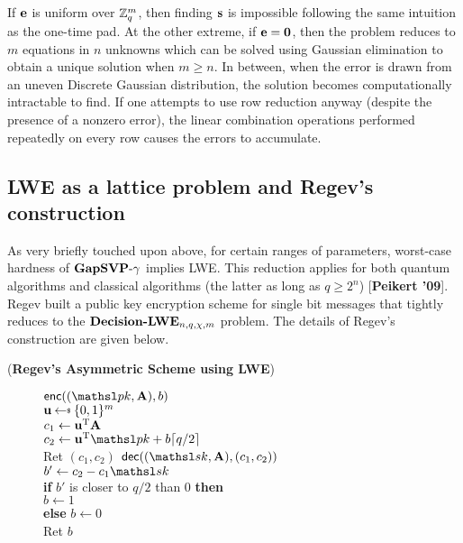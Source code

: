\begin{remark}
If $\mathbf{e}$ is uniform over ${{\mathbb Z}}^m_q$, then finding $\mathbf{s}$ is impossible following the same intuition as the one-time pad. At the other extreme, if ${{\bf e}} = \textbf{0}$, then the problem reduces to $m$ equations in $n$ unknowns which can be solved using Gaussian elimination to obtain a unique solution when $m \geq n$. In between, when the error is drawn from an uneven Discrete Gaussian distribution, the solution becomes computationally intractable to find. If one attempts to use row reduction anyway (despite the presence of a nonzero error), the linear combination operations performed repeatedly on every row causes the errors to accumulate.
\end{remark}

\subsection{LWE as a lattice problem and Regev's construction}
As very briefly touched upon above, for certain ranges of parameters, worst-case hardness of $\textbf{GapSVP}\textnormal{-}\gamma$ implies LWE. This reduction applies for both quantum algorithms \cite{Regev2005} and classical algorithms (the latter as long as $q \ge 2^n$) [\textbf{Peikert '09}]. Regev \cite{Regev2005} built a public key encryption scheme for single bit messages that tightly reduces to the $\textbf{Decision-LWE}_{n,q,\chi,m}$ problem. The details of Regev's construction are given below.

\begin{construction}
(\textbf{Regev's Asymmetric Scheme using LWE})
\begin{figure}[h]
\centering
{}
{
    \underline{$\enc((\pk,\varvect{A}), b)$}\\[1pt]
    $\varvect{u} \getsr \bits^m$\\
    $c_1 \gets \mathbf{u}^{\textnormal{T}} \mathbf{A}$\\
    $c_2 \gets \varvect{u}^{\textnormal{T}} \pk + b \lceil q/2 \rceil$\\
    Ret $(c_1, c_2)$
} 
{
    \underline{$\dec((\sk,\varvect{A}), (c_1,c_2))$}\\[1pt]
    $b' \gets c_2 - c_1 \sk$\\
    \textbf{if} $b'$ is closer to $q/2$ than 0 \textbf{then}\\
    \hspace*{1em} $b \gets 1$\\
    \textbf{else} $b \gets 0$\\
    Ret $b$
}
\end{figure}
\end{construction}

